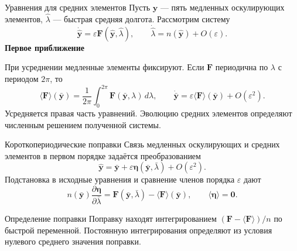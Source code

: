 \documentclass[11pt,aspectratio=169,t]{beamer}
\begin{document}
\begin{frame}{Уравнения для средних элементов}
\setlength{\abovedisplayskip}{5pt}
\setlength{\belowdisplayskip}{5pt}
\setlength{\abovedisplayshortskip}{0pt}
\setlength{\belowdisplayshortskip}{4pt}
\justifying
Пусть $\widehat{\mathbf y}$ --- пять медленных оскулирующих элементов, $\hat\lambda$ --- быстрая средняя долгота. Рассмотрим систему
\[
\dot{\widehat{\mathbf y}}=\varepsilon\mathbf F(\widehat{\mathbf y},\hat\lambda),
\qquad
\dot{\hat\lambda}=n(\widehat{\mathbf y})+O(\varepsilon).
\]
\medskip
\textbf{\color{courseaccent}Первое приближение}\par
\justifying
При усреднении медленные элементы фиксируют. Если $\mathbf F$ периодична по $\lambda$ с периодом $2\pi$, то
\[
\langle\mathbf F\rangle(\bar{\mathbf y})
=\frac{1}{2\pi}\int_0^{2\pi}\mathbf F(\bar{\mathbf y},\lambda)\,d\lambda,
\qquad
\dot{\bar{\mathbf y}}=\varepsilon\langle\mathbf F\rangle(\bar{\mathbf y})
+O(\varepsilon^2).
\]
\justifying
Усредняется правая часть уравнений. Эволюцию средних элементов определяют численным решением полученной системы.
\end{frame}

\begin{frame}{Короткопериодические поправки}
\setlength{\abovedisplayskip}{5pt}
\setlength{\belowdisplayskip}{5pt}
\setlength{\abovedisplayshortskip}{0pt}
\setlength{\belowdisplayshortskip}{4pt}
\justifying
Связь медленных оскулирующих и средних элементов в первом порядке задаётся преобразованием
\[
\widehat{\mathbf y}=\bar{\mathbf y}
+\varepsilon\boldsymbol\eta(\bar{\mathbf y},\bar\lambda)
+O(\varepsilon^2).
\]
Подстановка в исходные уравнения и сравнение членов порядка $\varepsilon$ дают
\[
n(\bar{\mathbf y})\frac{\partial\boldsymbol\eta}{\partial\bar\lambda}
=\mathbf F(\bar{\mathbf y},\bar\lambda)
-\langle\mathbf F\rangle(\bar{\mathbf y}),
\qquad
\langle\boldsymbol\eta\rangle=\mathbf0.
\]
\begin{block}{Определение поправки}
\justifying
Поправку находят интегрированием $(\mathbf F-\langle\mathbf F\rangle)/n$ по быстрой переменной. Постоянную интегрирования определяют из условия нулевого среднего значения поправки.
\end{block}
\end{frame}
\end{document}

